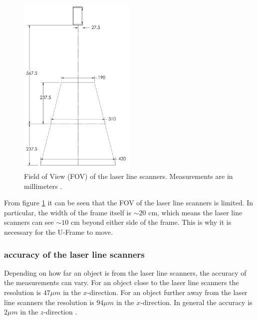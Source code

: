 \begin{figure}[H]
    \centering
    \includegraphics[width=0.5\textwidth]{images/laser_line_scanner_fov.png}
    \caption{Field of View (FOV) of the laser line scanners. Measurements are in millimeters \cite{gocator2650FOV}.}
    \label{fig:lls_fov}
\end{figure}
From figure \ref{fig:lls_fov} it can be seen that the FOV of the laser line scanners is limited. In particular,
the width of the frame itself is $\sim 20$ cm, which means the laser line scanners can see $\sim 10$ cm beyond either
side of the frame. This is why it is necessary for the U-Frame to move.

\subsubsection{accuracy of the laser line scanners}
Depending on how far an object is from the laser line scanners, the accuracy of the measurements can vary. For an object close
to the laser line scanners the resolution is $47 \mu m$ in the $x$-direction. For an object
further away from the laser line scanners the resolution is $94 \mu m$ in the $x$-direction. In general the accuracy is
$2 \mu m$ in the $z$-direction \cite{gocator2650accuracy}.


\newpage
